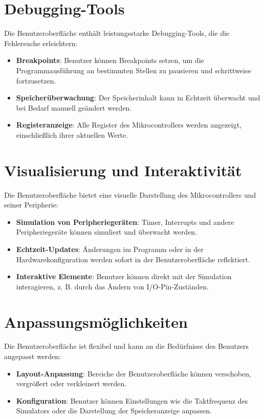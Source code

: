 \documentclass[a4paper,11pt]{report}
\begin{document}
\section{Debugging-Tools}
Die Benutzeroberfläche enthält leistungsstarke Debugging-Tools, die die Fehlersuche erleichtern:
\begin{itemize}
    \item \textbf{Breakpoints}: Benutzer können Breakpoints setzen, um die Programmausführung an bestimmten Stellen zu pausieren und schrittweise fortzusetzen.
    \item \textbf{Speicherüberwachung}: Der Speicherinhalt kann in Echtzeit überwacht und bei Bedarf manuell geändert werden.
    \item \textbf{Registeranzeige}: Alle Register des Mikrocontrollers werden angezeigt, einschließlich ihrer aktuellen Werte.
\end{itemize}

\section{Visualisierung und Interaktivität}
Die Benutzeroberfläche bietet eine visuelle Darstellung des Mikrocontrollers und seiner Peripherie:
\begin{itemize}
    \item \textbf{Simulation von Peripheriegeräten}: Timer, Interrupts und andere Peripheriegeräte können simuliert und überwacht werden.
    \item \textbf{Echtzeit-Updates}: Änderungen im Programm oder in der Hardwarekonfiguration werden sofort in der Benutzeroberfläche reflektiert.
    \item \textbf{Interaktive Elemente}: Benutzer können direkt mit der Simulation interagieren, z. B. durch das Ändern von I/O-Pin-Zuständen.
\end{itemize}

\section{Anpassungsmöglichkeiten}
Die Benutzeroberfläche ist flexibel und kann an die Bedürfnisse des Benutzers angepasst werden:
\begin{itemize}
    \item \textbf{Layout-Anpassung}: Bereiche der Benutzeroberfläche können verschoben, vergrößert oder verkleinert werden.
    \item \textbf{Konfiguration}: Benutzer können Einstellungen wie die Taktfrequenz des Simulators oder die Darstellung der Speicheranzeige anpassen.
\end{itemize}
\end{document}

